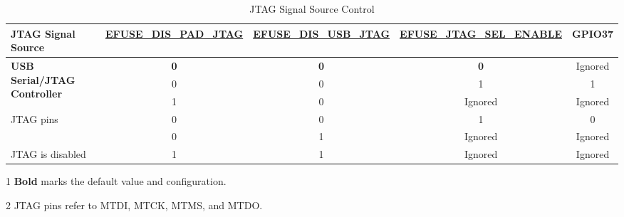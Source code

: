 \documentclass[main\_\_EN.tex]{subfiles}
\begin{document}
\begin{table}[H]
    \centering
    \caption{JTAG Signal Source Control}
    \label{tab:jtag-signal-src-control}
    \begin{threeparttable}
    \begin{tabular}{ | l | c | c | c | c | }
    \hline
    
    \rowcolor{lightgray}
    \textbf{JTAG Signal Source} & \textbf{\hyperref[fielddesc:EFUSEDISPADJTAG]{EFUSE\_DIS\_PAD\_JTAG}} & \textbf{\hyperref[fielddesc:EFUSEDISUSBJTAG]{EFUSE\_DIS\_USB\_JTAG}} & \textbf{\hyperref[fielddesc:EFUSEJTAGSELENABLE]{EFUSE\_JTAG\_SEL\_ENABLE}} &   \textbf{GPIO37}       \\\hline

    \multirow{3}{*}{\textbf{USB Serial/JTAG Controller}} & \textbf{0} & \textbf{0} & \textbf{0} & Ignored \\ \cline{2-5} 
     & 0 & 0 & 1 & 1 \\ \cline{2-5} 
     & 1 & 0 & Ignored & Ignored \\ \hline
    \multirow{2}{*}{JTAG pins \tnote{2}} & 0 & 0 & 1 & 0 \\ \cline{2-5} 
     & 0 & 1 & Ignored & Ignored \\ \hline
    JTAG is disabled & 1 & 1 & Ignored & Ignored \\ \hline
    \end{tabular}

        \begin{tablenotes}
            \item[1] \textbf{Bold} marks the default value and configuration.
            \item[2] JTAG pins refer to MTDI, MTCK, MTMS, and MTDO.
        \end{tablenotes}
    \end{threeparttable}
\end{table}
\end{document}

